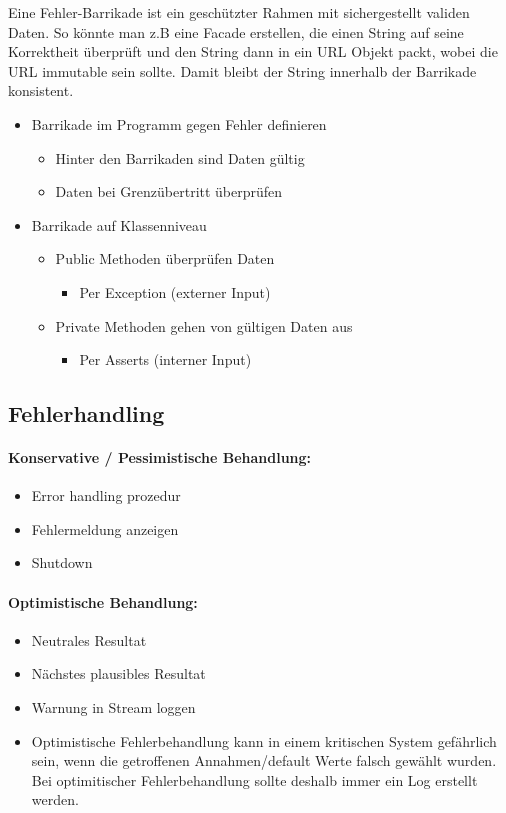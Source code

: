Eine Fehler-Barrikade ist ein geschützter Rahmen mit sichergestellt validen Daten. So könnte man z.B eine Facade erstellen, die einen String auf seine Korrektheit überprüft und den String dann in ein URL Objekt packt, wobei die URL immutable sein sollte. Damit bleibt der String innerhalb der Barrikade konsistent.
\begin{itemize}
\item Barrikade im Programm gegen Fehler definieren
	\begin{itemize}
		\item Hinter den Barrikaden sind Daten gültig
		\item Daten bei Grenzübertritt überprüfen
	\end{itemize}
\item Barrikade auf Klassenniveau
	\begin{itemize}
		\item Public Methoden überprüfen Daten
			\begin{itemize}
			\item Per  Exception (externer Input)
			\end{itemize}
		\item Private Methoden gehen von gültigen Daten aus
			\begin{itemize}
				\item Per Asserts (interner Input)
			\end{itemize}
	\end{itemize}
\end{itemize}


\subsection{Fehlerhandling}

\paragraph{Konservative / Pessimistische Behandlung:}
\begin{itemize}
	\item Error handling prozedur
	\item Fehlermeldung anzeigen
	\item Shutdown
\end{itemize}

\paragraph{Optimistische Behandlung:}
\begin{itemize}
	\item Neutrales Resultat
	\item Nächstes plausibles Resultat
	\item Warnung in Stream loggen
	\item Optimistische Fehlerbehandlung kann in einem kritischen System gefährlich sein, wenn die getroffenen Annahmen/default Werte falsch gewählt wurden. Bei optimitischer Fehlerbehandlung sollte deshalb immer ein Log erstellt werden. 
\end{itemize}

